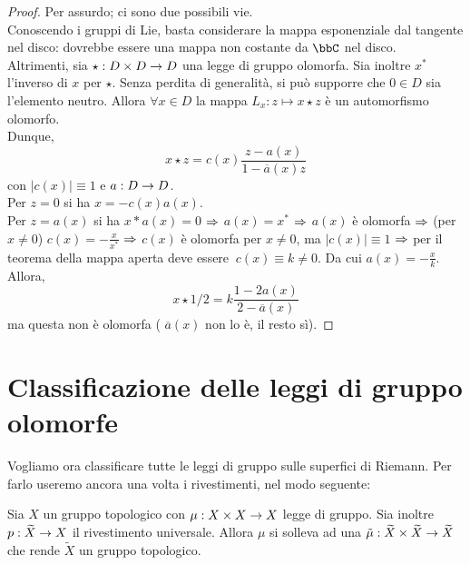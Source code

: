 \begin{proof}
Per assurdo; ci sono due possibili vie.\\
Conoscendo i gruppi di Lie, basta considerare la mappa esponenziale dal tangente nel disco: dovrebbe essere una mappa non costante da $\bbC$ nel disco. \hfill \Lightning \\
Altrimenti, sia $\star : D\times D \rightarrow D$ una legge di gruppo olomorfa. Sia inoltre $x^{*}$ l'inverso di $x$ per $\star$. Senza perdita di generalità, si può supporre che $0 \in D$ sia l'elemento neutro.
Allora $\forall x\in D$ la mappa $L_{x}: z\mapsto x\star z$ è un automorfismo olomorfo. \\
Dunque,  $$x\star z = c(x)\frac{z -a(x)}{1- \overline{a}(x) z}$$
con $|c(x)|\equiv 1$ e $a:D \rightarrow D$.\\
Per $z=0$ si ha $x=-c(x)a(x)$.\\
Per $z=a(x)$ si ha $x*a(x)=0$ $\Rightarrow$ $a(x)=x^{*}$ $\Rightarrow$ $a(x)$ è olomorfa $\Rightarrow$ (per $x\neq 0$) $c(x)=-\frac{x}{x^{*}}$ $\Rightarrow$ $c(x)$ è olomorfa per $x\neq 0$, ma $|c(x)| \equiv 1$ $\Rightarrow$ per il teorema della mappa aperta deve essere $ \ c(x) \equiv k \neq 0$. Da cui $a(x)= -\frac{x}{k}$.\\
Allora, $$x\star 1/2 = k\frac{1-2a(x)}{2-\overline{a}(x)}$$
ma questa non è olomorfa ( $\overline{a}(x)$ non lo è, il resto sì).

\end{proof}

\section{Classificazione delle leggi di gruppo olomorfe}
Vogliamo ora classificare tutte le leggi di gruppo sulle superfici di Riemann. Per farlo useremo ancora una volta i rivestimenti, nel modo seguente:

\begin{lemma}
Sia $X$ un gruppo topologico con $\mu : X\times X \rightarrow X$ legge di gruppo. Sia inoltre $p :\widetilde{X} \rightarrow X$ il rivestimento universale.
Allora $\mu$ si solleva ad una $\tilde{\mu} : \widetilde{X} \times \widetilde{X} \rightarrow \widetilde{X}$ che rende $\widetilde{X}$ un gruppo topologico.
\end{lemma}

